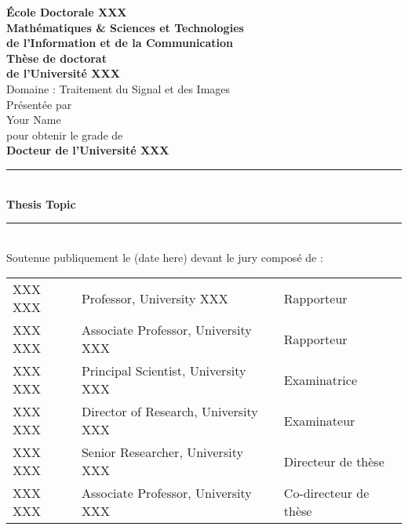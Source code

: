 \thispagestyle{empty}
\addtolength{\hoffset}{-.5cm}
\addtolength{\textheight}{1cm}
\begin{center}
{\normalfont\bfseries École Doctorale XXX}\\
{\normalfont\bfseries Mathématiques \& Sciences et Technologies}\\
{\normalfont\bfseries de l’Information et de la Communication}\\
\vspace{15pt}
{\Large\bfseries Thèse de doctorat}\\
{\Large\bfseries de l’Université XXX}\\
{\normalfont Domaine : Traitement du Signal et des Images}\\
\vspace{15pt}
{\normalfont Présentée par}\\ 
{\Large Your Name}\\
{\normalfont pour obtenir le grade de}\\
\vspace{15pt}
{\LARGE\bfseries Docteur de l’Université XXX}\\
\vspace{15pt}
\rule[2mm]{150mm}{0.2mm}\\
{\LARGE\bfseries Thesis Topic \\}
\rule[-2mm]{150mm}{0.2mm}\\
\vspace{15pt}
{\normalfont Soutenue publiquement le (date here) devant le jury composé de :}\\
\vspace{15pt}
{\small
\begin{tabular}{l l l}
XXX {\normalfont \scshape XXX}  & Professor, University XXX & Rapporteur\\ 
XXX {\normalfont \scshape XXX} & Associate Professor, University XXX & Rapporteur\\
XXX {\normalfont \scshape XXX}   & Principal Scientist, University XXX & Examinatrice\\
XXX {\normalfont \scshape XXX} & Director of Research, University XXX & Examinateur\\  
XXX {\normalfont \scshape XXX}  & Senior Researcher, University XXX & Directeur de thèse\\
XXX {\normalfont \scshape XXX}   & Associate Professor, University XXX & Co-directeur de thèse
\end{tabular}
}
\end{center}
